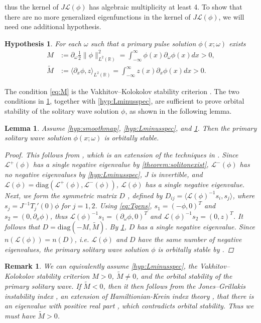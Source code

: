 \documentclass[12pt]{elsarticle}
\def\R{{\mathbb R}}
\def\calL{{\mathcal L}}
\newtheorem{lemma}{Lemma}
\newtheorem{hypothesis}{Hypothesis}
\newtheorem{remark}{Remark}
\begin{document}
thus the kernel of $J \calL(\phi)$ has algebraic multiplicity at least 4. To show that there are no more generalized eigenfunctions in the kernel of $J \calL(\phi)$, we will need one additional hypothesis. 
\begin{hypothesis}\label{hyp:Mcond}
For each $\omega$ such that a primary pulse solution $\phi(x; \omega)$ exists
\begin{align}
M &:= \partial_\omega \frac{1}{2} \| \phi \|_{L^2(\R)}^2
= \int_{-\infty}^\infty \phi(x) \partial_\omega \phi(x) dx > 0, \label{eq:M} \\
\tilde{M} &:= \langle \partial_x \phi, z \rangle_{L^2(\R)} = \int_{-\infty}^\infty z(x) \partial_x \phi(x) dx > 0. \label{eq:tildeM}
\end{align}
\end{hypothesis}
The condition \cref{eq:M} is the Vakhitov–Kolokolov stability criterion \cite{Vakhitov1973}. The two conditions in \cref{hyp:Mcond}, together with \cref{hyp:Lminusspec}, are sufficient to prove orbital stability of the solitary wave solution $\phi$, as shown in the following lemma.
\begin{lemma}\label{lemma:stability}
Assume \cref{hyp:smoothmap}, \cref{hyp:Lminusspec}, and \cref{hyp:Mcond}. Then the primary solitary wave solution $\phi(x; \omega)$ is orbitally stable.
\begin{proof}
This follows from \cite[Section 5.2.2]{Kapitula2013}, which is an extension of the techniques in \cite{Grillakis1990}. Since $\calL^+(\phi)$ has a single negative eigenvalue by \cref{theorem:solitonexist}, $\calL^-(\phi)$ has no negative eigenvalues by \cref{hyp:Lminusspec}, $J$ is invertible, and $\calL(\phi) = \text{diag}(\calL^+(\phi), \calL^-(\phi))$, $\calL(\phi)$ has a single negative eigenvalue. Next, we form the symmetric matrix $D$ \cite[(5.2.53)]{Kapitula2013}, defined by 
$D_{ij} = \langle \calL(\phi)^{-1} s_i, s_j \rangle$, where $s_j = J^{-1} T_j'(0) \phi$ for $j = 1, 2$. Using \cref{eq:Tgens}, $s_1 = (-\phi, 0)^T$ and $s_2 = (0, \partial_x \phi)$, thus $\calL(\phi)^{-1} s_1 = (\partial_\omega \phi, 0)^T$ and $\calL(\phi)^{-1} s_2 = (0, z)^T$. It follows that $D = \text{diag}(-M, \tilde{M})$. By \cref{hyp:Mcond}, $D$ has a single negative eigenvalue. Since $n(\calL(\phi)) = n(D)$, i.e. $\calL(\phi)$ and $D$ have the same number of negative eigenvalues, the primary solitary wave solution $\phi$ is orbitally stable by \cite[Theorem 5.2.11]{Kapitula2013}.
\end{proof}
\end{lemma}
\begin{remark}We can equivalently assume \cref{hyp:Lminusspec}, the Vakhitov–Kolokolov stability criterion $M > 0$, $\tilde{M} \neq 0$, and the orbital stability of the primary solitary wave. If $\tilde{M} < 0$, then it then follows from the Jones–Grillakis instability index \cite{Grillakis1988}, an extension of Hamiltionian-Krein index theory \cite[Section 7.1]{Kapitula2013}, that there is an eigenvalue with positive real part \cite[Theorem 7.1.16]{Kapitula2013}, which contradicts orbital stability. Thus we must have $\tilde{M} > 0$.
\end{remark}
\end{document}

